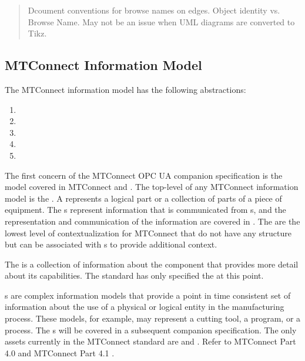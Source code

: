 \begin{quote}
    \color{red} Dcoument conventions for browse names on edges. Object identity vs. Browse Name. May not be an issue when UML diagrams are converted to Tikz.
\end{quote}

\FloatBarrier

\subsection{MTConnect Information Model}

The MTConnect information model has the following abstractions:

\begin{enumerate}
\item {}
\item {}
\item {}
\item {}
\item {}
\end{enumerate}

The first concern of the MTConnect OPC UA companion specification is the  model covered in MTConnect \cite{MTCPart2} and \cite{MTCPart3}. The top-level  of any MTConnect information model is the . A  represents a logical part or a collection of parts of a piece of equipment. The s represent information that is communicated from s, and the representation and communication of the information are covered in \cite{MTCPart3}. The  are the lowest level of contextualization for MTConnect  that do not have any structure but can be associated with s to provide additional context. 

The  is a collection of information about the component that provides more detail about its capabilities. The standard has only specified the  at this point.

s are complex information models that provide a point in time consistent set of information about the use of a physical or logical entity in the manufacturing process. These models, for example, may represent a cutting tool, a program, or a process. The s will be covered in a subsequent companion specification. The only assets currently in the MTConnect standard are  and . Refer to MTConnect Part 4.0 \cite{MTCPart40} and MTConnect Part 4.1 \cite{MTCPart41}.

